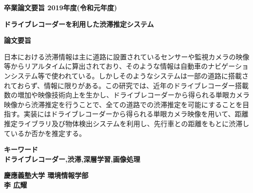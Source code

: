 \begin{center}
\textbf{\Large 卒業論文要旨 2019年度(令和元年度)}

\vspace{6.18mm}

\textbf{\Large ドライブレコーダーを利用した渋滞推定システム}
\end{center}

\vspace{10mm}

\begin{flushleft}
\textbf{論文要旨}\\
\end{flushleft}
日本における渋滞情報は主に道路に設置されているセンサーや監視カメラの映像等からリアルタイムに算出されており、そのような情報は自動車のナビゲーションシステム等で使われている。しかしそのようなシステムは一部の道路に搭載されておらず、情報に限りがある。この研究では、近年のドライブレコーダー搭載数の増加や映像技術向上を生かし、ドライブレコーダーから得られる単眼カメラ映像から渋滞推定を行うことで、全ての道路での渋滞推定を可能にすることを目指す。実装にはドライブレコーダーから得られる単眼カメラ映像を用いて、距離推定ライブラリ及び物体検出システムを利用し、先行車との距離をもとに渋滞しているか否かを推定する。


\begin{flushleft}
\textbf{キーワード}\\
\textbf{ドライブレコーダー,渋滞,深層学習,画像処理}

\end{flushleft}

\begin{flushright}
\textbf{慶應義塾大学 環境情報学部}\\
\textbf{李 広耀}
\end{flushright}
\newpage

